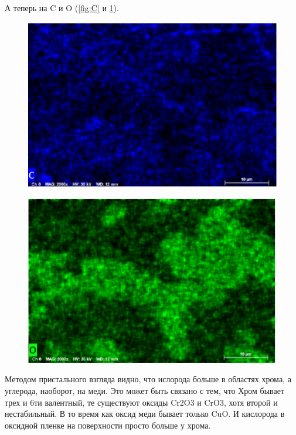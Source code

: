 \documentclass[a4paper,12pt]{article}
\begin{document}
 А теперь на C и O (\ref{fig:C} и \ref{fig:O}).
 \begin{figure}[h]
\centering
\begin{minipage}{.5\textwidth}
  \centering
  \includegraphics[width=1\linewidth]{C.png}
  \label{fig:C}
\end{minipage}%
\begin{minipage}{.5\textwidth}
  \centering
  \includegraphics[width=1\linewidth]{O.png}
  \label{fig:O}
\end{minipage}
\end{figure}
Методом пристального взгляда видно, что ислорода больше в областях хрома, а углерода, наоборот, на меди. Это может быть связано с тем, что Хром бывает трех и 6ти валентный, те существуют оксиды Cr2O3 и CrO3, хотя второй и нестабильный. В то время как оксид меди бывает только CuO. И кислорода в оксидной пленке на поверхности просто больше у хрома.
\end{document}

